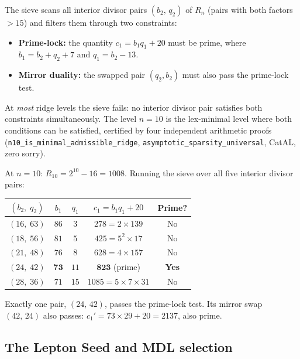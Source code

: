 \documentclass[11pt,a4paper]{article}
\newcommand{\lean}[1]{\texttt{#1}}
\newcommand{\CatAL}{\textsf{CatAL}}
\begin{document}
The sieve scans all interior divisor pairs $(b_2,\,q_2)$ of $R_n$ (pairs with both
factors $> 15$) and filters them through two constraints:
\begin{itemize}[itemsep=2pt]
  \item \textbf{Prime-lock:} the quantity $c_1 = b_1 q_1 + 20$ must be prime, where
    $b_1 = b_2 + q_2 + 7$ and $q_1 = b_2 - 13$.
  \item \textbf{Mirror duality:} the swapped pair $(q_2, b_2)$ must also pass the
    prime-lock test.
\end{itemize}
{\sloppy
At \emph{most} ridge levels the sieve fails: no interior divisor pair satisfies both
constraints simultaneously.  The level $n = 10$ is the lex-minimal level where both
conditions can be satisfied, certified by four independent arithmetic proofs
(\lean{n10\_is\_minimal\_admissible\_ridge},
\lean{asymptotic\_sparsity\_universal}, \CatAL, zero sorry).
\par}

At $n = 10$: $R_{10} = 2^{10} - 16 = 1008$.  Running the sieve over all five
interior divisor pairs:

\begin{center}
\small
\renewcommand{\arraystretch}{1.35}
\begin{tabular}{@{}ccccc@{}}
\toprule
$(b_2,\;q_2)$ & $b_1$ & $q_1$ & $c_1 = b_1 q_1 + 20$ & Prime? \\
\midrule
$(16,\;63)$ & $86$          & $3$  & $278 = 2\times139$          & No  \\
$(18,\;56)$ & $81$          & $5$  & $425 = 5^2\times17$         & No  \\
$(21,\;48)$ & $76$          & $8$  & $628 = 4\times157$          & No  \\
$(24,\;42)$ & $\mathbf{73}$ & $11$ & $\mathbf{823}$ (prime)      & \textbf{Yes} \\
$(28,\;36)$ & $71$          & $15$ & $1085 = 5\times7\times31$  & No  \\
\bottomrule
\end{tabular}
\end{center}

Exactly one pair, $(24,\,42)$, passes the prime-lock test.  Its mirror swap
$(42,\,24)$ also passes: $c_1' = 73\times 29 + 20 = 2137$, also prime.

\subsection{The Lepton Seed and MDL selection}
\end{document}
